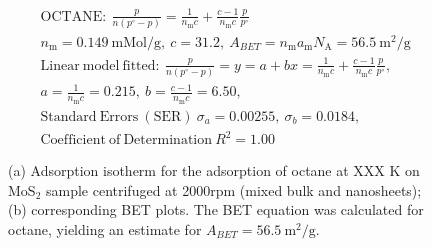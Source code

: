 

\begin{align*}
&\mathrm{OCTANE:}\ \frac{p}{n(p^\circ-p)}=\frac{1}{n_\mathrm{m}c}+\frac{c-1}{n_\mathrm{m}c}\frac{p}{p^\circ}\\
&{n_\mathrm{m}}=0.149\ \mathrm{mMol/g},\ c=31.2,\ A_{BET}={n_\mathrm{m}}{a_\mathrm{m}}{N_\mathrm{A}}=56.5\ \mathrm{m}^2\mathrm{/g}\\
&\mathrm{Linear\ model\ fitted:}\ \frac{p}{n(p^\circ-p)}=y=a+bx=\frac{1}{n_\mathrm{m}c}+\frac{c-1}{n_\mathrm{m}c}\frac{p}{p^\circ},\\
&a=\frac{1}{n_\mathrm{m}c}=0.215,\ b=\frac{c-1}{n_\mathrm{m}c}=6.50,\\
&\mathrm{Standard\ Errors\ (SER)}\ \sigma_a=0.00255,\ \sigma_b=0.0184,\\
&\mathrm{Coefficient\ of\ Determination}\ R^2 = 1.00
\end{align*}


\begin{figure}[htb]
\hfill
{}
\caption{(a) Adsorption isotherm for the adsorption of octane at XXX K on MoS$_2$ 
sample centrifuged at 2000rpm (mixed bulk and nanosheets);
(b) corresponding BET plots. The BET equation was calculated for octane, yielding an estimate for $A_{BET}=56.5\ \mathrm{m}^2\mathrm{/g}$.}

\label{fig:sa-Nanosheets-Prep-I-1500rpm-10mg-01-3mm-30C-S2-SA-10ml}
\end{figure}


